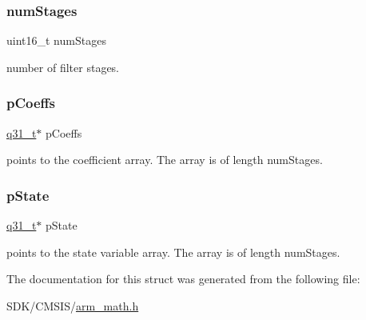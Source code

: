 \subsubsection{\texorpdfstring{num\+Stages}{numStages}}
{\footnotesize\ttfamily uint16\+\_\+t num\+Stages}

number of filter stages. \mbox{\label{structarm__fir__lattice__instance__q31_a68888e36167d81cb7836db10367a1682}} 
\subsubsection{\texorpdfstring{p\+Coeffs}{pCoeffs}}
{\footnotesize\ttfamily \mbox{\hyperlink{arm__math_8h_adc89a3547f5324b7b3b95adec3806bc0}{q31\+\_\+t}}$\ast$ p\+Coeffs}

points to the coefficient array. The array is of length num\+Stages. \mbox{\label{structarm__fir__lattice__instance__q31_adee4ba3ee8869865af7d8fa08ca913d6}} 
\subsubsection{\texorpdfstring{p\+State}{pState}}
{\footnotesize\ttfamily \mbox{\hyperlink{arm__math_8h_adc89a3547f5324b7b3b95adec3806bc0}{q31\+\_\+t}}$\ast$ p\+State}

points to the state variable array. The array is of length num\+Stages. 

The documentation for this struct was generated from the following file\+:\begin{DoxyCompactItemize}
\item 
S\+D\+K/\+C\+M\+S\+I\+S/\mbox{\hyperlink{arm__math_8h}{arm\+\_\+math.\+h}}\end{DoxyCompactItemize}
